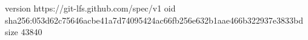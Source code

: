 version https://git-lfs.github.com/spec/v1
oid sha256:053d62c75646acbe41a7d74095424ac66fb256e632b1aae466b322937e3833bd
size 43840
